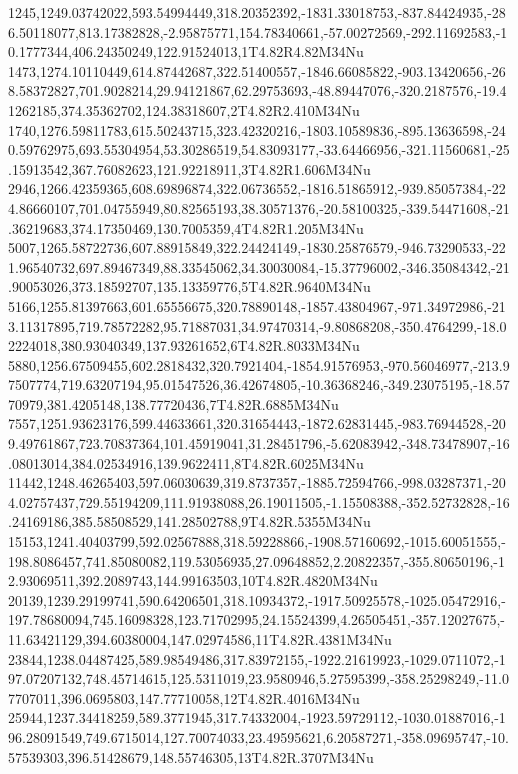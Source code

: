 1245,1249.03742022,593.54994449,318.20352392,-1831.33018753,-837.84424935,-286.50118077,813.17382828,-2.95875771,154.78340661,-57.00272569,-292.11692583,-10.1777344,406.24350249,122.91524013,1T4.82R4.82M34Nu
1473,1274.10110449,614.87442687,322.51400557,-1846.66085822,-903.13420656,-268.58372827,701.9028214,29.94121867,62.29753693,-48.89447076,-320.2187576,-19.41262185,374.35362702,124.38318607,2T4.82R2.410M34Nu
1740,1276.59811783,615.50243715,323.42320216,-1803.10589836,-895.13636598,-240.59762975,693.55304954,53.30286519,54.83093177,-33.64466956,-321.11560681,-25.15913542,367.76082623,121.92218911,3T4.82R1.606M34Nu
2946,1266.42359365,608.69896874,322.06736552,-1816.51865912,-939.85057384,-224.86660107,701.04755949,80.82565193,38.30571376,-20.58100325,-339.54471608,-21.36219683,374.17350469,130.7005359,4T4.82R1.205M34Nu
5007,1265.58722736,607.88915849,322.24424149,-1830.25876579,-946.73290533,-221.96540732,697.89467349,88.33545062,34.30030084,-15.37796002,-346.35084342,-21.90053026,373.18592707,135.13359776,5T4.82R.9640M34Nu
5166,1255.81397663,601.65556675,320.78890148,-1857.43804967,-971.34972986,-213.11317895,719.78572282,95.71887031,34.97470314,-9.80868208,-350.4764299,-18.02224018,380.93040349,137.93261652,6T4.82R.8033M34Nu
5880,1256.67509455,602.2818432,320.7921404,-1854.91576953,-970.56046977,-213.97507774,719.63207194,95.01547526,36.42674805,-10.36368246,-349.23075195,-18.5770979,381.4205148,138.77720436,7T4.82R.6885M34Nu
7557,1251.93623176,599.44633661,320.31654443,-1872.62831445,-983.76944528,-209.49761867,723.70837364,101.45919041,31.28451796,-5.62083942,-348.73478907,-16.08013014,384.02534916,139.9622411,8T4.82R.6025M34Nu
11442,1248.46265403,597.06030639,319.8737357,-1885.72594766,-998.03287371,-204.02757437,729.55194209,111.91938088,26.19011505,-1.15508388,-352.52732828,-16.24169186,385.58508529,141.28502788,9T4.82R.5355M34Nu
15153,1241.40403799,592.02567888,318.59228866,-1908.57160692,-1015.60051555,-198.8086457,741.85080082,119.53056935,27.09648852,2.20822357,-355.80650196,-12.93069511,392.2089743,144.99163503,10T4.82R.4820M34Nu
20139,1239.29199741,590.64206501,318.10934372,-1917.50925578,-1025.05472916,-197.78680094,745.16098328,123.71702995,24.15524399,4.26505451,-357.12027675,-11.63421129,394.60380004,147.02974586,11T4.82R.4381M34Nu
23844,1238.04487425,589.98549486,317.83972155,-1922.21619923,-1029.0711072,-197.07207132,748.45714615,125.5311019,23.9580946,5.27595399,-358.25298249,-11.07707011,396.0695803,147.77710058,12T4.82R.4016M34Nu
25944,1237.34418259,589.3771945,317.74332004,-1923.59729112,-1030.01887016,-196.28091549,749.6715014,127.70074033,23.49595621,6.20587271,-358.09695747,-10.57539303,396.51428679,148.55746305,13T4.82R.3707M34Nu
